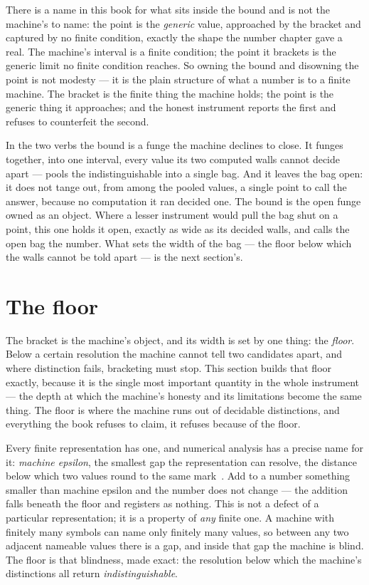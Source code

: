 There is a name in this book for what sits inside the bound and is not the machine's to name: the point is the
\emph{generic} value, approached by the bracket and captured by no finite condition, exactly the shape the number
chapter gave a real. The machine's interval is a finite condition; the point it brackets is the generic limit no finite
condition reaches. So owning the bound and disowning the point is not modesty --- it is the plain structure of what a
number is to a finite machine. The bracket is the finite thing the machine holds; the point is the generic thing it
approaches; and the honest instrument reports the first and refuses to counterfeit the second.

In the two verbs the bound is a funge the machine declines to close. It funges together, into one interval, every value
its two computed walls cannot decide apart --- pools the indistinguishable into a single bag. And it leaves the bag
open: it does not tange out, from among the pooled values, a single point to call the answer, because no computation it
ran decided one. The bound is the open funge owned as an object. Where a lesser instrument would pull the bag shut on a
point, this one holds it open, exactly as wide as its decided walls, and calls the open bag the number. What sets the
width of the bag --- the floor below which the walls cannot be told apart --- is the next section's.

\section{The floor}

The bracket is the machine's object, and its width is set by one thing: the \emph{floor}. Below a certain resolution the
machine cannot tell two candidates apart, and where distinction fails, bracketing must stop. This section builds that
floor exactly, because it is the single most important quantity in the whole instrument --- the depth at which the
machine's honesty and its limitations become the same thing. The floor is where the machine runs out of decidable
distinctions, and everything the book refuses to claim, it refuses because of the floor.

Every finite representation has one, and numerical analysis has a precise name for it: \emph{machine epsilon}, the
smallest gap the representation can resolve, the distance below which two values round to the same
mark~\cite{golub2013}. Add to a number something smaller than machine epsilon and the number does not change --- the
addition falls beneath the floor and registers as nothing. This is not a defect of a particular representation; it is a
property of \emph{any} finite one. A machine with finitely many symbols can name only finitely many values, so between
any two adjacent nameable values there is a gap, and inside that gap the machine is blind. The floor is that blindness,
made exact: the resolution below which the machine's distinctions all return \emph{indistinguishable}.

